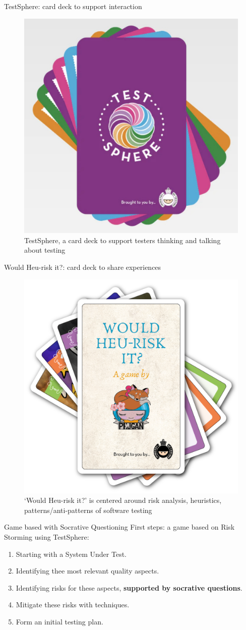 \documentclass[aspectratio=169]{beamer}
\begin{document}
\begin{frame}{TestSphere: card deck to support interaction}
\begin{figure}
    \centering
    \includegraphics[width=0.5\linewidth]{images//games/testsphere}
    \caption{TestSphere, a card deck to support testers thinking and talking about testing}
\end{figure}
\end{frame}

\begin{frame}{Would Heu-risk it?: card deck to share experiences}
\begin{figure}
    \centering
    \includegraphics[width=0.5\linewidth]{images//games/would}
    \caption{`Would Heu-risk it?' is centered around risk analysis, heuristics, patterns/anti-patterns of software testing}
\end{figure}
\end{frame}

\begin{frame}{Game based with Socrative Questioning}
    First steps: a game based on Risk Storming using TestSphere:
    \begin{enumerate}
        \item Starting with a System Under Test.
        \item Identifying thee most relevant quality aspects.
        \item Identifying risks for these aspects, \textbf{supported by socrative questions}.
        \item Mitigate these risks with techniques.
        \item Form an initial testing plan.
    \end{enumerate}
\end{frame}
\end{document}
